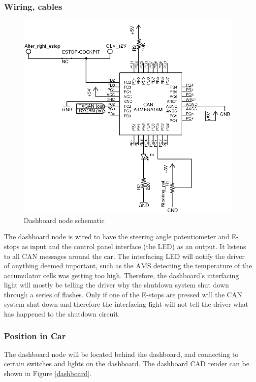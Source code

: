 \documentclass{article}
\begin{document}
        \subsubsection{Wiring, cables}

            \begin{figure}[H]
                \centering
                \includegraphics[width = 0.8 \textwidth]{CANdashboard}
                \caption{Dashboard node schematic}
                \label{dashschem}
            \end{figure}

            The dashboard node is wired to have the steering angle potentiometer and E-stops as input and the control panel interface (the LED) as an output. It listens to all CAN messages around the car. The interfacing LED will notify the driver of anything deemed important, such as the AMS detecting the temperature of the accumulator cells was getting too high. Therefore, the dashboard's interfacing light will mostly be telling the driver why the shutdown system shut down through a series of flashes. Only if one of the E-stops are pressed will the CAN system shut down and therefore the interfacing light will not tell the driver what has happened to the shutdown circuit.

        \subsubsection{Position in Car}

            The dashboard node will be located behind the dashboard, and connecting to certain switches and lights on the dashboard. The dashboard CAD render can be shown in Figure \ref{dashboard}.
\end{document}
